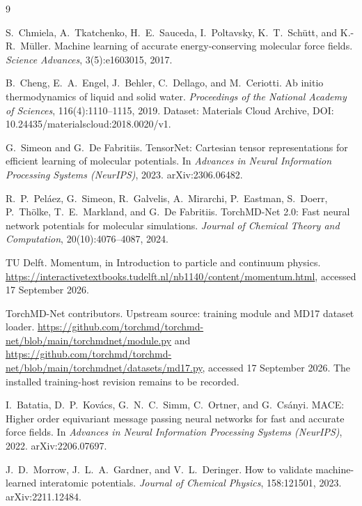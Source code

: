 \documentclass[11pt]{article}
\begin{document}

\begin{thebibliography}{9}

S.~Chmiela, A.~Tkatchenko, H.~E.~Sauceda, I.~Poltavsky, K.~T.~Sch{\"u}tt,
and K.-R.~M{\"u}ller.
\newblock Machine learning of accurate energy-conserving molecular force
fields.
\newblock \emph{Science Advances}, 3(5):e1603015, 2017.

B.~Cheng, E.~A.~Engel, J.~Behler, C.~Dellago, and M.~Ceriotti.
\newblock Ab initio thermodynamics of liquid and solid water.
\newblock \emph{Proceedings of the National Academy of Sciences},
116(4):1110--1115, 2019.
\newblock Dataset: Materials Cloud Archive,
DOI: 10.24435/materialscloud:2018.0020/v1.

G.~Simeon and G.~De Fabritiis.
\newblock TensorNet: Cartesian tensor representations for efficient learning
of molecular potentials.
\newblock In \emph{Advances in Neural Information Processing Systems
(NeurIPS)}, 2023.
\newblock arXiv:2306.06482.

R.~P.~Pel{\'a}ez, G.~Simeon, R.~Galvelis, A.~Mirarchi, P.~Eastman,
S.~Doerr, P.~Th{\"o}lke, T.~E.~Markland, and G.~De Fabritiis.
\newblock TorchMD-Net 2.0: Fast neural network potentials for molecular
simulations.
\newblock \emph{Journal of Chemical Theory and Computation},
20(10):4076--4087, 2024.

TU Delft.
\newblock Momentum, in Introduction to particle and continuum physics.
\newblock \url{https://interactivetextbooks.tudelft.nl/nb1140/content/momentum.html},
accessed 17 September 2026.

TorchMD-Net contributors.
\newblock Upstream source: training module and MD17 dataset loader.
\newblock \url{https://github.com/torchmd/torchmd-net/blob/main/torchmdnet/module.py}
and \url{https://github.com/torchmd/torchmd-net/blob/main/torchmdnet/datasets/md17.py},
accessed 17 September 2026. The installed training-host revision remains
to be recorded.

I.~Batatia, D.~P.~Kov{\'a}cs, G.~N.~C.~Simm, C.~Ortner, and G.~Cs{\'a}nyi.
\newblock MACE: Higher order equivariant message passing neural networks for
fast and accurate force fields.
\newblock In \emph{Advances in Neural Information Processing Systems
(NeurIPS)}, 2022.
\newblock arXiv:2206.07697.

J.~D.~Morrow, J.~L.~A.~Gardner, and V.~L.~Deringer.
\newblock How to validate machine-learned interatomic potentials.
\newblock \emph{Journal of Chemical Physics}, 158:121501, 2023.
\newblock arXiv:2211.12484.


\end{thebibliography}
\end{document}
